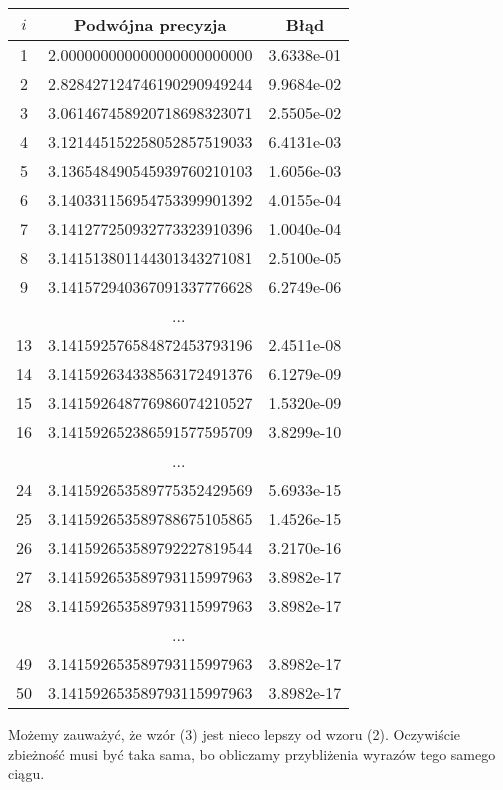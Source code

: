 \documentclass[10pt,wide]{mwart}
\theoremstyle{definition}
\begin{document}
\begin{minipage}[t]{0.5\textwidth}
  \begin{tabular}{|c||c|c||} \hline
    \(i\) & Podwójna precyzja & Błąd \\ \hline
    1 & 2.000000000000000000000000 & 3.6338e-01 \\ \hline
    2 & 2.828427124746190290949244 & 9.9684e-02 \\ \hline
    3 & 3.061467458920718698323071 & 2.5505e-02 \\ \hline
    4 & 3.121445152258052857519033 & 6.4131e-03 \\ \hline
    5 & 3.136548490545939760210103 & 1.6056e-03 \\ \hline
    6 & 3.140331156954753399901392 & 4.0155e-04 \\ \hline
    7 & 3.141277250932773323910396 & 1.0040e-04 \\ \hline
    8 & 3.141513801144301343271081 & 2.5100e-05 \\ \hline
    9 & 3.141572940367091337776628 & 6.2749e-06 \\ \hline
    \multicolumn{3}{|c|}{...} \\ \hline
    13 & 3.141592576584872453793196 & 2.4511e-08 \\ \hline
    14 & 3.141592634338563172491376 & 6.1279e-09 \\ \hline
    15 & 3.141592648776986074210527 & 1.5320e-09 \\ \hline
    16 & 3.141592652386591577595709 & 3.8299e-10 \\ \hline
    \multicolumn{3}{|c|}{...} \\ \hline
    24 & 3.141592653589775352429569 & 5.6933e-15 \\ \hline
    25 & 3.141592653589788675105865 & 1.4526e-15 \\ \hline
    26 & 3.141592653589792227819544 & 3.2170e-16 \\ \hline
    27 & 3.141592653589793115997963 & 3.8982e-17 \\ \hline
    28 & 3.141592653589793115997963 & 3.8982e-17 \\ \hline
    \multicolumn{3}{|c|}{...}\\ \hline
    49 & 3.141592653589793115997963 & 3.8982e-17 \\ \hline
    50 & 3.141592653589793115997963 & 3.8982e-17 \\ \hline
  \end{tabular}
\end{minipage}
\par Możemy zauważyć, że wzór (3) jest nieco lepszy od wzoru (2). Oczywiście zbieżność musi być taka sama, bo obliczamy przybliżenia wyrazów tego samego ciągu.
\end{document}
